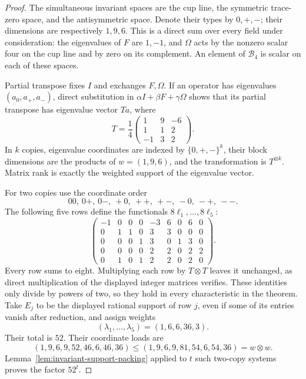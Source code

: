 \begin{proof}
The simultaneous invariant spaces are the cup line, the symmetric
trace-zero space, and the antisymmetric space. Denote their types
by $0,+,-$; their dimensions are respectively $1,9,6$.
This is a direct sum over every field under consideration: the
eigenvalues of $F$ are $1,-1$, and $\Omega$ acts by the nonzero
scalar four on the cup line and by zero on its complement.
An element of $\mathcal B_4$ is scalar on each of these spaces.

Partial transpose fixes $I$ and exchanges $F,\Omega$.
If an operator has eigenvalues $(a_0,a_+,a_-)$, direct substitution
in $\alpha I+\beta F+\gamma\Omega$ shows that its partial
transpose has eigenvalue vector $Ta$, where
\begin{equation}\label{eq:flip-cup-four-transform}
 T=\frac14\begin{pmatrix}
 1&9&-6\\1&1&2\\-1&3&2
 \end{pmatrix}.
\end{equation}
In $k$ copies, eigenvalue coordinates are indexed by $\{0,+,-\}^k$,
their block dimensions are the products of $w=(1,9,6)$, and the
transformation is $T^{\otimes k}$. Matrix rank is exactly the
weighted support of the eigenvalue vector.

For two copies use the coordinate order
\[
 00,\ 0+,\ 0-,\ +0,\ ++,\ +-,\ -0,\ -+,\ --.
\]
The following five rows define the functionals $8\ell_1,\ldots,8\ell_5$:
\begin{equation}\label{eq:flip-cup-four-certificate}
 \begin{pmatrix}
 -1&0&0&0&-3&6&0&6&0\\
 0&1&1&0&3&3&0&0&0\\
 0&0&0&1&3&0&1&3&0\\
 0&0&0&0&2&2&0&2&2\\
 0&1&0&1&2&2&0&2&0
 \end{pmatrix}.
\end{equation}
Every row sums to eight. Multiplying each row by $T\otimes T$
leaves it unchanged, as direct multiplication of the displayed
integer matrices verifies. These identities only divide by powers
of two, so they hold in every characteristic in the theorem.
Take $E_j$ to be the displayed rational support of row $j$, even
if some of its entries vanish after reduction, and assign weights
\[
 (\lambda_1,\ldots,\lambda_5)=(1,6,6,36,3).
\]
Their total is $52$. Their coordinate loads are
\[
 (1,9,6,9,52,46,6,46,36)
 \leq(1,9,6,9,81,54,6,54,36)=w\otimes w.
\]
Lemma~\ref{lem:invariant-support-packing} applied to $t$ such
two-copy systems proves the factor $52^t$.


\end{proof}

